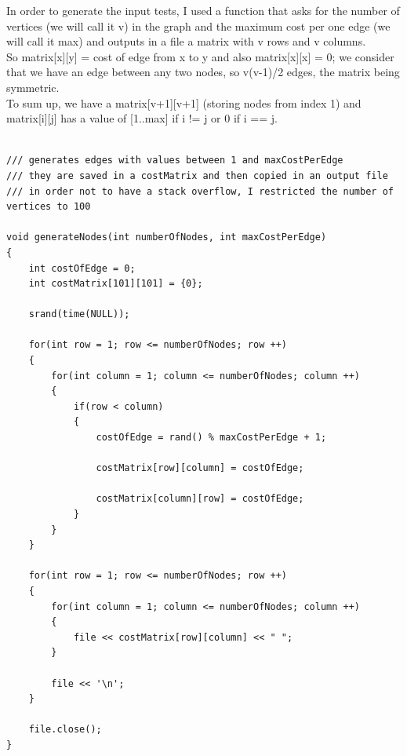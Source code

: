 \documentclass[12pt, a4paper]{article}
\begin{document}
\normalsize
\vspace{10mm}
\begin{flushleft}

\hspace{5mm}In order to generate the input tests, I used a function that asks for the number of vertices (we will call it v) in the graph and the maximum cost per one edge (we will call it max) and outputs in a file a matrix with v rows and v columns.\\
\vspace{3mm}
\hspace{5mm} So matrix[x][y] = cost of edge from x to y and also matrix[x][x] = 0; we consider that we have an edge between any two nodes, so v(v-1)/2 edges, the matrix being symmetric. \\
\vspace{3mm}
\hspace{5mm} To sum up, we have a matrix[v+1][v+1] (storing nodes from index 1) and matrix[i][j] has a value of [1..max] if i != j or 0 if i == j.

\vspace{5mm}
\scriptsize
\begin{lstlisting}

/// generates edges with values between 1 and maxCostPerEdge
/// they are saved in a costMatrix and then copied in an output file
/// in order not to have a stack overflow, I restricted the number of vertices to 100

void generateNodes(int numberOfNodes, int maxCostPerEdge)
{
    int costOfEdge = 0;
    int costMatrix[101][101] = {0};

    srand(time(NULL));

    for(int row = 1; row <= numberOfNodes; row ++)
    {
        for(int column = 1; column <= numberOfNodes; column ++)
        {
            if(row < column)
            {
                costOfEdge = rand() % maxCostPerEdge + 1;

                costMatrix[row][column] = costOfEdge;

                costMatrix[column][row] = costOfEdge;
            }
        }
    }

    for(int row = 1; row <= numberOfNodes; row ++)
    {
        for(int column = 1; column <= numberOfNodes; column ++)
        {
            file << costMatrix[row][column] << " ";
        }

        file << '\n';
    }

    file.close();
}

\end{lstlisting}
\end{flushleft}
\end{document}
